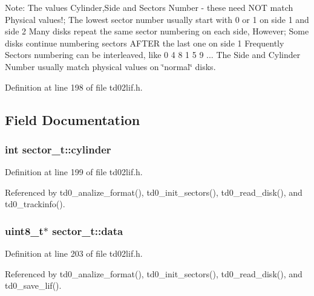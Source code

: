 Note\+: The values Cylinder,Side and Sectors Number -\/ these need N\+OT match Physical values!; The lowest sector number usually start with 0 or 1 on side 1 and side 2 Many disks repeat the same sector numbering on each side, However; Some disks continue numbering sectors A\+F\+T\+ER the last one on side 1 Frequently Sectors numbering can be interleaved, like 0 4 8 1 5 9 ... The Side and Cylinder Number usually match physical values on \char`\"{}normal\char`\"{} disks. 

Definition at line 198 of file td02lif.\+h.



\subsection{Field Documentation}
\subsubsection[{\texorpdfstring{cylinder}{cylinder}}]{\setlength{\rightskip}{0pt plus 5cm}int sector\+\_\+t\+::cylinder}\hypertarget{structsector__t_abf5eb245097466ac9624e59a379a2409}{}\label{structsector__t_abf5eb245097466ac9624e59a379a2409}


Definition at line 199 of file td02lif.\+h.



Referenced by td0\+\_\+analize\+\_\+format(), td0\+\_\+init\+\_\+sectors(), td0\+\_\+read\+\_\+disk(), and td0\+\_\+trackinfo().

\subsubsection[{\texorpdfstring{data}{data}}]{\setlength{\rightskip}{0pt plus 5cm}uint8\+\_\+t$\ast$ sector\+\_\+t\+::data}\hypertarget{structsector__t_a3a7122a3121eb84094a889be7e6ed042}{}\label{structsector__t_a3a7122a3121eb84094a889be7e6ed042}


Definition at line 203 of file td02lif.\+h.



Referenced by td0\+\_\+analize\+\_\+format(), td0\+\_\+init\+\_\+sectors(), td0\+\_\+read\+\_\+disk(), and td0\+\_\+save\+\_\+lif().

